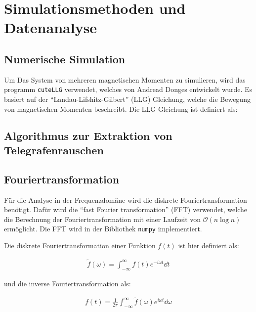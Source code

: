 \documentclass[main.tex]{subfiles}
\begin{document}
\section{Simulationsmethoden und Datenanalyse}

\subsection{Numerische Simulation}
Um Das System von mehreren magnetischen Momenten zu simulieren, wird das programm \texttt{cuteLLG}\cite{cuteLLG} verwendet, welches von Andread Donges entwickelt wurde. Es basiert auf der \enquote{Landau-Lifshitz-Gilbert} (LLG) Gleichung, welche die Bewegung von magnetischen Momenten beschreibt. Die LLG Gleichung ist definiert als:

\subsection{Algorithmus zur Extraktion von Telegrafenrauschen}


\cite{random-telegraph-analysis}
\subsection{Fouriertransformation}

Für die Analyse in der Frequenzdomäne wird die diskrete Fouriertransformation benötigt. Dafür wird die \enquote{fast Fourier transformation} (FFT) verwendet, welche die Berechnung der Fouriertransformation mit einer Laufzeit von $\mathcal{O}(n \log n)$ ermöglicht. Die FFT wird in der Bibliothek \texttt{numpy}\cite{numpy} implementiert.

Die diskrete Fouriertransformation einer Funktion $f(t)$ ist hier definiert als:

\begin{align}
    \tilde{f}(\omega) = \int_{-\infty}^{\infty} f(t) e^{-i \omega t} \dd{t}
\end{align}

und die inverse Fouriertransformation als:

\begin{align}
    f(t) = \frac{1}{2 \pi} \int_{-\infty}^{\infty} \tilde{f}(\omega) e^{i \omega t} \dd{\omega}
\end{align}\cite{numpy-fft}


\end{document}
